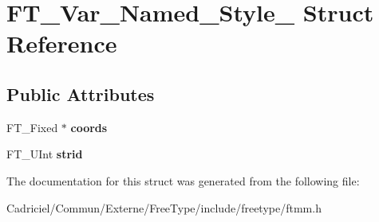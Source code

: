 \hypertarget{struct_f_t___var___named___style__}{}\section{F\+T\+\_\+\+Var\+\_\+\+Named\+\_\+\+Style\+\_\+ Struct Reference}
\label{struct_f_t___var___named___style__}
\subsection*{Public Attributes}
\begin{DoxyCompactItemize}
\item 
F\+T\+\_\+\+Fixed $\ast$ {\bfseries coords}\hypertarget{struct_f_t___var___named___style___a07195d55aee541db651ef3a8b04bb41f}{}\label{struct_f_t___var___named___style___a07195d55aee541db651ef3a8b04bb41f}

\item 
F\+T\+\_\+\+U\+Int {\bfseries strid}\hypertarget{struct_f_t___var___named___style___a7802f6958c6e883bdce16b9931002826}{}\label{struct_f_t___var___named___style___a7802f6958c6e883bdce16b9931002826}

\end{DoxyCompactItemize}


The documentation for this struct was generated from the following file\+:\begin{DoxyCompactItemize}
\item 
Cadriciel/\+Commun/\+Externe/\+Free\+Type/include/freetype/ftmm.\+h\end{DoxyCompactItemize}
